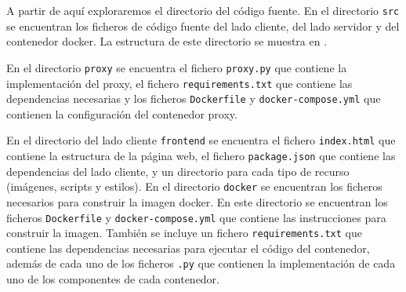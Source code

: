 A partir de aquí exploraremos el directorio del código fuente. En el directorio \texttt{src} se encuentran los ficheros de código fuente del lado cliente, del lado servidor y del contenedor docker. La estructura de este directorio se muestra en .

\begin{figure}[htb]
    {
    \begin{tcolorbox}
    \end{tcolorbox}
    }
\end{figure}
En el directorio \texttt{proxy} se encuentra el fichero \texttt{proxy.py} que contiene la implementación del proxy, el fichero \texttt{requirements.txt} que contiene las dependencias necesarias y los ficheros \texttt{Dockerfile} y \texttt{docker-compose.yml} que contienen la configuración del contenedor proxy.

En el directorio del lado cliente \texttt{frontend} se encuentra el fichero \texttt{index.html} que contiene la estructura de la página web, el fichero \texttt{package.json} que contiene las dependencias del lado cliente, y un directorio para cada tipo de recurso (imágenes, scripts y estilos). 
En el directorio \texttt{docker} se encuentran los ficheros necesarios para construir la imagen docker. En este directorio se encuentran los ficheros \texttt{Dockerfile} y \texttt{docker-compose.yml} que contiene las instrucciones para construir la imagen. También se incluye un fichero \texttt{requirements.txt} que contiene las dependencias necesarias para ejecutar el código del contenedor, además de cada uno de los ficheros \texttt{.py} que contienen la implementación de cada uno de los componentes de cada contenedor.  

